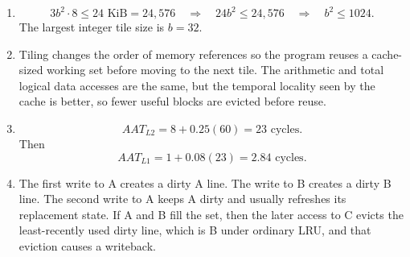 \documentclass[11pt]{article}
\begin{document}
\begin{enumerate}
    \item
    \[
        3b^2\cdot8\le24\text{ KiB}=24{,}576
        \quad\Rightarrow\quad
        24b^2\le24{,}576
        \quad\Rightarrow\quad
        b^2\le1024.
    \]
    The largest integer tile size is \(b=32\).

    \item Tiling changes the order of memory references so the program reuses a cache-sized working set before moving to the next tile.
    The arithmetic and total logical data accesses are the same, but the temporal locality seen by the cache is better, so fewer useful blocks are evicted before reuse.

    \item
    \[
        AAT_{L2}=8+0.25(60)=23\text{ cycles}.
    \]
    Then
    \[
        AAT_{L1}=1+0.08(23)=2.84\text{ cycles}.
    \]

    \item The first write to A creates a dirty A line.
    The write to B creates a dirty B line.
    The second write to A keeps A dirty and usually refreshes its replacement state.
    If A and B fill the set, then the later access to C evicts the least-recently used dirty line, which is B under ordinary LRU, and that eviction causes a writeback.
\end{enumerate}
\end{document}
